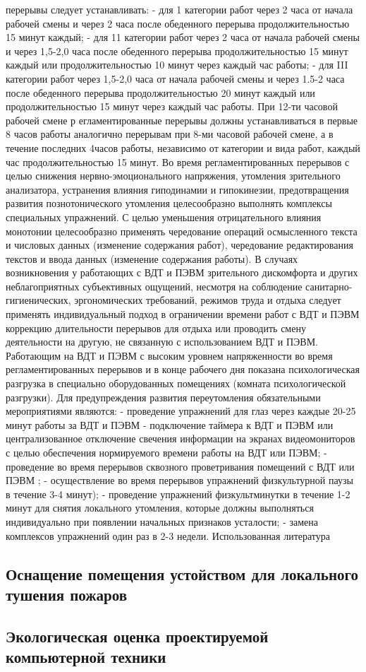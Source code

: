 перерывы следует устанавливать: - для 1 категории работ через 2 часа от начала рабочей смены и через 2 часа после обеденного перерыва продолжительностью 15 минут каждый; - для 11 категории работ через 2 часа от начала рабочей смены и через 1,5-2,0 часа после обеденного перерыва продолжительностью 15 минут каждый или продолжительностью 10 минут через каждый час работы; - для III категории работ через 1,5-2,0 часа от начала рабочей смены и через 1.5-2 часа после обеденного перерыва продолжительностью 20 минут каждый или продолжительностью 15 минут через каждый час работы. При 12-ти часовой рабочей смене р егламентированные перерывы должны устанавливаться в первые 8 часов работы аналогично перерывам при 8-ми часовой рабочей смене, а в течение последних 4часов работы, независимо от категории и вида работ, каждый час продолжительностью 15 минут. Во время регламентированных перерывов с целью снижения нервно-эмоционального напряжения, утомления зрительного анализатора, устранения влияния гиподинамии и гипокинезии, предотвращения развития познотонического утомления целесообразно выполнять комплексы специальных упражнений. С целью уменьшения отрицательного влияния монотонии целесообразно применять чередование операций осмысленного текста и числовых данных (изменение содержания работ), чередование редактирования текстов и ввода данных (изменение содержания работы). В случаях возникновения у работающих с ВДТ и ПЭВМ зрительного дискомфорта и других неблагоприятных субъективных ощущений, несмотря на соблюдение санитарно-гигиенических, эргономических требований, режимов труда и отдыха следует применять индивидуальный подход в ограничении времени работ с ВДТ и ПЭВМ коррекцию длительности перерывов для отдыха или проводить смену деятельности на другую, не связанную с использованием ВДТ и ПЭВМ. Работающим на ВДТ и ПЭВМ с высоким уровнем напряженности во время регламентированных перерывов и в конце рабочего дня показана психологическая разгрузка в специально оборудованных помещениях (комната психологической разгрузки). Для предупреждения развития переутомления обязательными мероприятиями являются: - проведение упражнений для глаз через каждые 20-25 минут работы за ВДТ и ПЭВМ - подключение таймера к ВДТ и ПЭВМ или централизованное отключение свечения информации на экранах видеомониторов с целью обеспечения нормируемого времени работы на ВДТ или ПЭВМ; - проведение во время перерывов сквозного проветривания помещений с ВДТ или ПЭВМ ; - осуществление во время перерывов упражнений физкультурной паузы в течение 3-4 минут); - проведение упражнений физкультминутки в течение 1-2 минут для снятия локального утомления, которые должны выполняться индивидуально при появлении начальных признаков усталости; - замена комплексов упражнений один раз в 2-3 недели. Использованная литература

\subsection{Оснащение помещения устойством для локального тушения пожаров}

\subsection{Экологическая оценка проектируемой компьютерной техники}

\newpage
